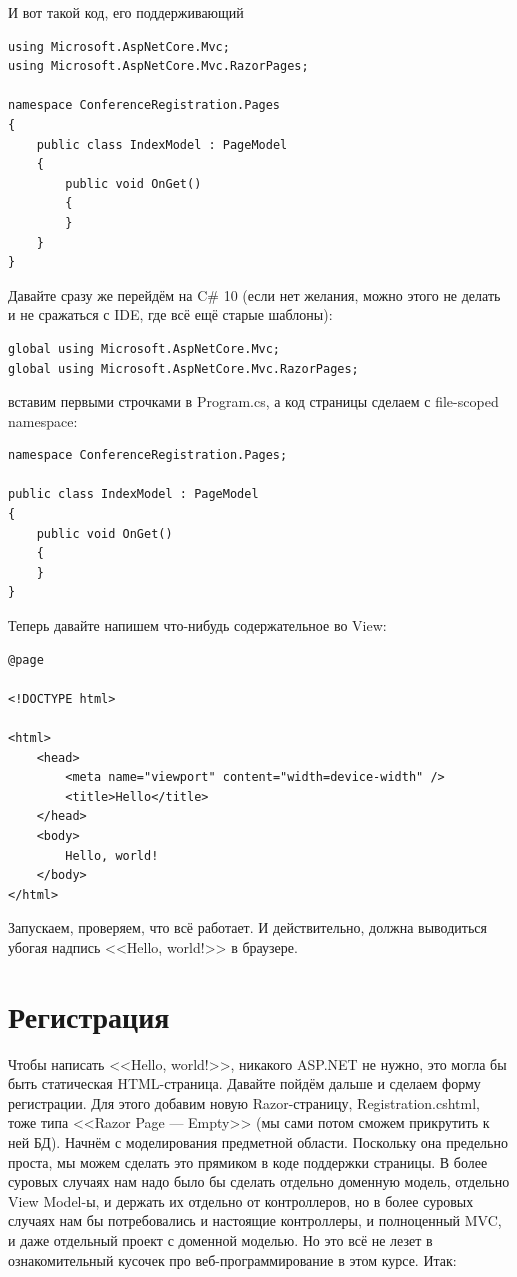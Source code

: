 \documentclass[a5paper]{article}
\begin{document}
И вот такой код, его поддерживающий

\begin{verbatim}
using Microsoft.AspNetCore.Mvc;
using Microsoft.AspNetCore.Mvc.RazorPages;

namespace ConferenceRegistration.Pages
{
    public class IndexModel : PageModel
    {
        public void OnGet()
        {
        }
    }
}
\end{verbatim}

Давайте сразу же перейдём на C\# 10 (если нет желания, можно этого не делать и не сражаться с IDE, где всё ещё старые шаблоны):

\begin{verbatim}
global using Microsoft.AspNetCore.Mvc;
global using Microsoft.AspNetCore.Mvc.RazorPages;
\end{verbatim}

вставим первыми строчками в Program.cs, а код страницы сделаем с file-scoped namespace:

\begin{verbatim}
namespace ConferenceRegistration.Pages;

public class IndexModel : PageModel
{
    public void OnGet()
    {
    }
}
\end{verbatim}

Теперь давайте напишем что-нибудь содержательное во View:

\begin{verbatim}
@page

<!DOCTYPE html>

<html>
    <head>
        <meta name="viewport" content="width=device-width" />
        <title>Hello</title>
    </head>
    <body>
        Hello, world!
    </body>
</html>
\end{verbatim}

Запускаем, проверяем, что всё работает. И действительно, должна выводиться убогая надпись <<Hello, world!>> в браузере.

\section{Регистрация}

Чтобы написать <<Hello, world!>>, никакого ASP.NET не нужно, это могла бы быть статическая HTML-страница. Давайте пойдём дальше и сделаем форму регистрации. Для этого добавим новую Razor-страницу, Registration.cshtml, тоже типа <<Razor Page --- Empty>> (мы сами потом сможем прикрутить к ней БД). Начнём с моделирования предметной области. Поскольку она предельно проста, мы можем сделать это прямиком в коде поддержки страницы. В более суровых случаях нам надо было бы сделать отдельно доменную модель, отдельно View Model-ы, и держать их отдельно от контроллеров, но в более суровых случаях нам бы потребовались и настоящие контроллеры, и полноценный MVC, и даже отдельный проект с доменной моделью. Но это всё не лезет в ознакомительный кусочек про веб-программирование в этом курсе. Итак:
\end{document}

